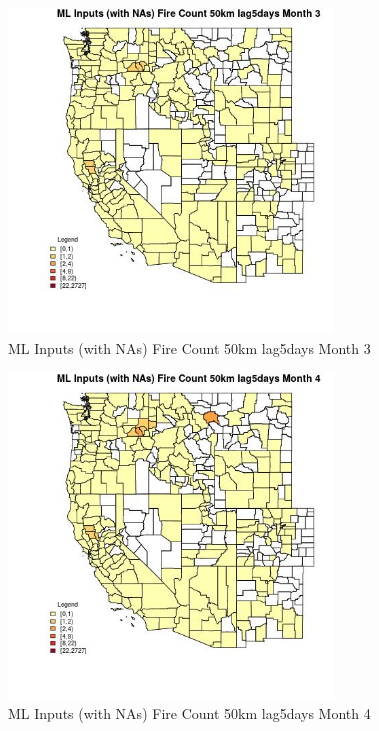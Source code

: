 \begin{figure} 
\centering  
\includegraphics[width=0.77\textwidth]{Code_Outputs/Report_ML_input_PM25_Step4_part_f_de_duplicated_aveswNAs_CountyFire_Count_50km_lag5daysmedianMonth3.jpg} 
\caption{\label{fig:Report_ML_input_PM25_Step4_part_f_de_duplicated_aveswNAsCountyFire_Count_50km_lag5daysmedianMonth3}ML Inputs (with NAs) Fire Count 50km lag5days Month 3} 
\end{figure} 
 

\begin{figure} 
\centering  
\includegraphics[width=0.77\textwidth]{Code_Outputs/Report_ML_input_PM25_Step4_part_f_de_duplicated_aveswNAs_CountyFire_Count_50km_lag5daysmedianMonth4.jpg} 
\caption{\label{fig:Report_ML_input_PM25_Step4_part_f_de_duplicated_aveswNAsCountyFire_Count_50km_lag5daysmedianMonth4}ML Inputs (with NAs) Fire Count 50km lag5days Month 4} 
\end{figure} 
 

